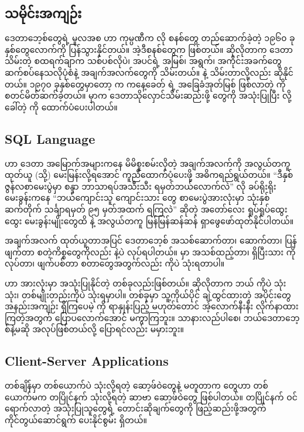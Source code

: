 \subsection*{သမိုင်းအကျဉ်း}
ဒေတာဘေ့စ်တွေရဲ့ မူလအစ  ဟာ  ကုမ္ပဏီက  လို စနစ်တွေ တည်ဆောက်ခဲ့တဲ့ ၁၉၆၀ ခုနှစ်တွေလောက်ကို ပြန်သွားနိုင်တယ်။ အဲ့ဒီစနစ်တွေက  ဖြစ်တယ်။ ဆိုလိုတာက ဒေတာသိမ်းတဲ့ စထရက်ချာက သစ်ပစ်လိုပဲ၊ အပင်ရဲ့ အမြစ်၊ အရွက်၊ အကိုင်းအခက်တွေ ဆက်စပ်နေသလိုပုံစံနဲ့ အချက်အလက်တွေကို သိမ်းတယ်။  နဲ့ သိမ်းတာလို့လည်း ဆိုနိုင်တယ်။ ၁၉၇၀ ခုနှစ်တွေမှာတော့  က ကနေ့ခေတ်  ရဲ့ အခြေခံအုတ်မြစ် ဖြစ်လာတဲ့  ကို စတင်မိတ်ဆက်ခဲ့တယ်။  မှာက ဒေတာသိုလှောင်သိမ်းဆည်းဖို့  တွေကို အသုံးပြုပြီး  လို့ခေါ်တဲ့  ကို ထောက်ပံပေးပါတယ်။ 

\subsection*{SQL Language}
 ဟာ   ဒေတာ အမြောက်အများကနေ မိမိစူးစမ်းလိုတဲ့ အချက်အလက်ကို အလွယ်တကူ ထုတ်ယူ (သို့) မေးမြန်းလို့ရအောင် ကူညီထောက်ပံ့ပေးဖို့ အဓိကရည်ရွယ်တယ်။ “ဒီနှစ် ဇွန်လစာမေးပွဲမှာ စန္ဒာ ဘာသာရပ်အသီးသီး ရမှတ်ဘယ်လောက်လဲ” လို  ခပ်ရိုးရိုး မေးခွန်းကနေ “ဘယ်ကျောင်းသူ ကျောင်းသား တွေ စာမေးပွဲအားလုံးမှာ သုံးနှစ်ဆက်တိုက် သင်္ချာရမှတ် ၉၅ မှတ်အထက်  ရကြလဲ” ဆိုတဲ့ အတော်လေး ရှုပ်ရှုပ်ထွေးထွေး မေးခွန်းမျိုးတွေထိ  နဲ့ အလွယ်တကူ မြန်မြန်ဆန်ဆန် ရှာဖွေဖော်ထုတ်နိုင်ပါတယ်။ 

အချက်အလက် ထုတ်ယူတာအပြင် ဒေတာဘေ့စ် အသစ်ဆောက်တာ၊  ဆောက်တာ၊ ပြန်ဖျက်တာ စတဲ့ကိစ္စတွေကိုလည်း  နဲ့ပဲ လုပ်ရပါတယ်။  မှာ  အသစ်ထည့်တာ၊ ရှိပြီးသား  ကို  လုပ်တာ၊ ဖျက်ပစ်တာ စတာတွေအတွက်လည်း  ကိုပဲ သုံးရတာပါ။ 

 ဟာ  အားလုံးမှာ အသုံးပြုနိုင်တဲ့  တစ်ခုလည်းဖြစ်တယ်။ ဆိုလိုတာက ဘယ်  ကိုပဲ သုံးသုံး၊  တစ်မျိုးတည်းကိုပဲ သုံးရမှာပါ။  တစ်ခုမှာ သူ့ကိုယ်ပိုင် ချဲ့ထွင်ထားတဲ့ အပိုင်းတွေ အနည်းအကျဉ်း ရှိကြပေမဲ့  ကို ရာနှုန်းပြည့် မဟုတ်တောင် အဲ့လောက်နီးနီး လိုက်နာထားကြတဲ့အတွက် ပြောပလောက်အောင် မကွာကြဘူး။  သာနားလည်ပါစေ၊ ဘယ်ဒေတာဘေ့စ်နဲ့မဆို အလုပ်ဖြစ်တယ်လို့ ပြောရင်လည်း မမှားဘူး။

\subsection*{Client-Server Applications}
တစ်ချိန်မှာ တစ်ယောက်ပဲ သုံးလို့ရတဲ့ ဆော့ဖ်ဝဲတွေနဲ့ မတူတာက  တွေဟာ တစ်ယောက်မက တပြိုင်နက် သုံးလို့ရတဲ့ ဆာဗာ  ဆော့ဖ်ဝဲတွေ ဖြစ်ပါတယ်။ တပြိုင်နက် ဝင်ရောက်လာတဲ့ အသုံးပြုသူတွေရဲ့ တောင်းဆိုချက်တွေကို ဖြည့်ဆည်းဖို့အတွက် ကိုင်တွယ်ဆောင်ရွက် ပေးနိုင်စွမ်း ရှိတယ်။ 

